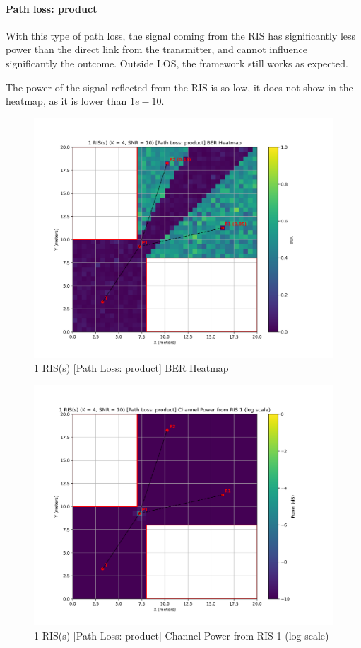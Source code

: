 \paragraph*{Path loss: product}

With this type of path loss, the signal coming from the RIS has significantly less power than the direct link from the transmitter, and cannot influence significantly the outcome. Outside LOS, the framework still works as expected.

The power of the signal reflected from the RIS is so low, it does not show in the heatmap, as it is lower than $1e-10$.

\begin{figure}[H]
  \centering
  \includegraphics[width=0.7\linewidth]{imgs/heatmap-simulations/1 RIS(s) (K = 4, SNR = 10) [Path Loss_ product] BER Heatmap.png}
  \caption{1 RIS(s) [Path Loss: product] BER Heatmap}
\end{figure}

\begin{figure}[H]
  \centering
  \includegraphics[width=0.7\linewidth]{imgs/heatmap-simulations/1 RIS(s) (K = 4, SNR = 10) [Path Loss_ product] Channel Power from RIS 1 (log scale).png}
  \caption{1 RIS(s) [Path Loss: product] Channel Power from RIS 1 (log scale)}
\end{figure}

